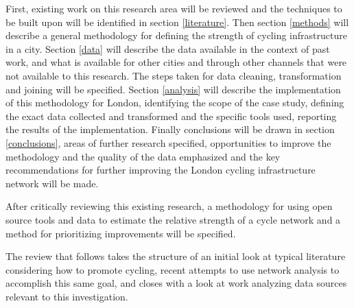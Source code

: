 First, existing work on this research area will be reviewed and the techniques to be built upon will be identified in section \ref{literature}.  Then  section \ref{methods} will describe a general methodology for defining the strength of cycling infrastructure in a city. Section \ref{data} will describe the data available in the context of past work, and what is available for other cities and through other channels that were not available to this research. The steps taken for data cleaning, transformation and joining will be specified. Section \ref{analysis} will describe the implementation of this methodology for London, identifying the scope of the case study, defining the exact data collected and transformed and the specific tools used, reporting the results of the implementation. Finally conclusions will be drawn in section \ref{conclusions}, areas of further research specified, opportunities to improve the methodology and the quality of the data emphasized and the key recommendations for further improving the London cycling infrastructure network will be made. 

After critically reviewing this existing research, a methodology for using open source tools and data to estimate the relative strength of a cycle network and a method for prioritizing improvements will be specified.

The review that follows takes the structure of an initial look at typical literature considering how to promote cycling, recent attempts to use network analysis to accomplish this same goal, and closes with a look at work analyzing data sources relevant to this investigation. 

%


